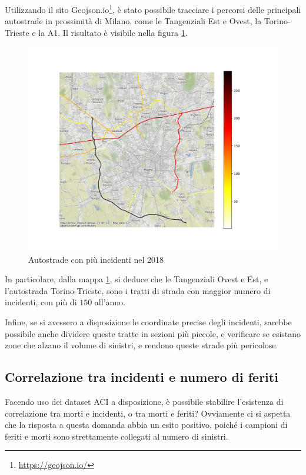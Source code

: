 \documentclass[a4paper,12pt]{report}
\begin{document}
Utilizzando il sito Geojson.io\footnote{\url{https://geojson.io/}}, 
è stato possibile tracciare i percorsi delle principali autostrade in prossimità di 
Milano, come le Tangenziali Est e Ovest, la Torino-Trieste e la A1. 
Il risultato è visibile nella figura \ref{fig:line-incidenti-milano}. 

\begin{figure}
    \includegraphics[width=\linewidth]{../src/incidenti/incidenti_aci/autostrade/incidenti_line_chart.png}
    \caption{Autostrade con più incidenti nel 2018}
    \label{fig:line-incidenti-milano}
\end{figure}

In particolare, dalla mappa \ref{fig:line-incidenti-milano}, si deduce che le 
Tangenziali Ovest e Est, e l'autostrada Torino-Trieste, sono i tratti di 
strada con maggior numero di incidenti, con più di $150$ all'anno. 

Infine, se si avessero a disposizione le coordinate precise degli incidenti, 
sarebbe possibile anche dividere queste tratte in sezioni più piccole, 
e verificare se esistano zone che alzano il volume di sinistri, e rendono queste strade 
più pericolose. 

\subsection{Correlazione tra incidenti e numero di feriti}

Facendo uso dei dataset ACI a disposizione, è possibile stabilire l'esistenza di 
correlazione tra morti e incidenti, o tra morti e feriti?
Ovviamente ci si aspetta che la risposta a questa domanda abbia un 
esito positivo, poiché 
i campioni di feriti e morti sono strettamente collegati al numero di sinistri. 
\end{document}
